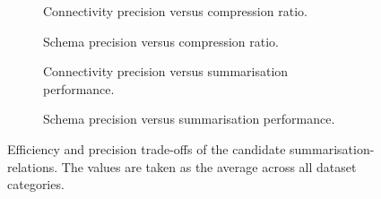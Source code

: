 \begin{figure}
	\centering
	\begin{subfigure}[t]{0.46\textwidth}
		\resizebox{\textwidth}{!}{
			
		}
		\caption{Connectivity precision versus compression ratio.}
		\label{chap5:precision:fig:trade-conn-volume}
	\end{subfigure}
	\qquad
	\begin{subfigure}[t]{0.46\textwidth}
		\resizebox{\textwidth}{!}{
			
		}
		\caption{Schema precision versus compression ratio.}
		\label{chap5:precision:fig:trade-schema-volume}
	\end{subfigure}
	\qquad%
	\begin{subfigure}[t]{0.46\textwidth}
		\resizebox{\textwidth}{!}{
			
		}
		\caption{Connectivity precision versus summarisation performance.}
		\label{chap5:precision:fig:trade-conn-cpu}
	\end{subfigure}
	\qquad%
	\begin{subfigure}[t]{0.46\textwidth}
		\resizebox{\textwidth}{!}{
			
		}
		\caption{Schema precision versus summarisation performance.}
		\label{chap5:precision:fig:trade-schema-cpu}
	\end{subfigure}
	\caption{Efficiency and precision trade-offs of the candidate \glspl{summarisation-relation}. The values are taken as the average across all dataset categories.}
\end{figure}

